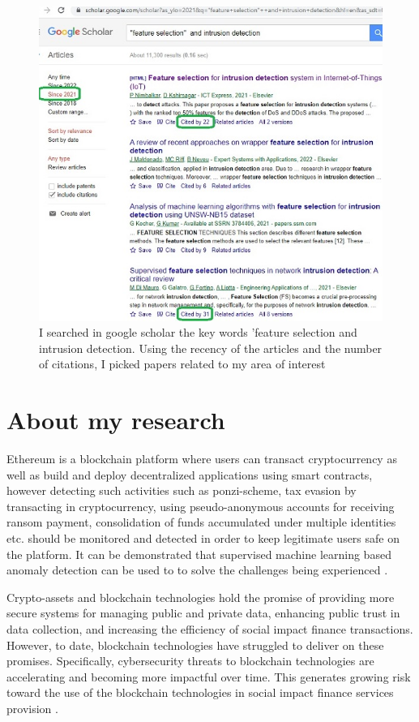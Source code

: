 \documentclass{article}
\begin{document}
\begin{figure}[H]
 \centering
  \includegraphics{images/myImage3.jpg}
 \caption{I searched in google scholar the key words 'feature selection and intrusion detection. Using the recency of the articles and the number of citations, I picked papers related to my area of interest}
 \label{fig:2}
\end{figure}

\section{About my research}

Ethereum is a blockchain platform where users can transact cryptocurrency as well as build and deploy decentralized applications using smart contracts, however detecting such activities such as ponzi-scheme, tax evasion by transacting in cryptocurrency, using pseudo-anonymous accounts for receiving ransom payment, consolidation of funds accumulated under multiple identities etc. should be monitored and detected in order to keep legitimate users safe on the platform. It can be demonstrated that supervised machine learning based anomaly detection can be used to to solve the challenges being experienced \cite{kumar2020detecting}.

Crypto-assets and blockchain technologies hold the promise of providing more secure systems for managing public and private data, enhancing public trust in data collection, and increasing the efficiency of social impact finance transactions. However, to date, blockchain technologies have struggled to deliver on these promises. Specifically, cybersecurity threats to blockchain technologies are accelerating and becoming more impactful over time. This generates growing risk toward the use of the blockchain technologies in social impact finance services provision \cite{gurdgiev2021informational}.
\end{document}
